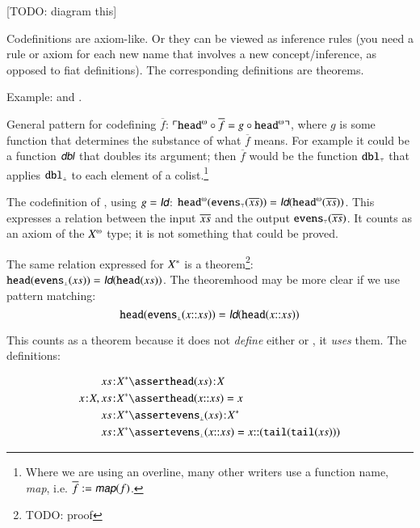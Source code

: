 [TODO: diagram this]


Codefinitions are axiom-like. Or they can be viewed as inference rules
(you need a rule or axiom for each new name that involves a new
concept/inference, as opposed to fiat definitions). The corresponding
definitions are theorems.

Example:  and .



\vspace{2ex}

General pattern for codefining \(\overline{f}\): \(\ulcorner
\cohead\circ\overline{f} = g\circ\cohead\urcorner\), where \(g\) is
some function that determines the substance of what \(\overline{f}\)
means. For example it could be a function \(\textsf{\slshape dbl}\)
that doubles its argument; then \(\overline{f}\) would be the function
\(\texttt{\upshape dbl}_{\scriptscriptstyle\top}\) that applies \(\texttt{\upshape dbl}_{\scriptscriptstyle\bot}\) to each element of a
colist.\footnote{Where we are using an overline, many other writers
use a function name, \textsf{\slshape map}, i.e. \(\overline{f} :=
\textsf{\slshape map}(f)\).}

\vspace{1ex}

The codefinition of , using \(g = \idfun\):
\(\cohead(\codefn{evens}(\coseq{x})) = \idfun(\cohead(\coseq{x}))\).
This expresses a relation between the input \(\overline{xs}\) and the
output \(\texttt{\upshape evens}_{\scriptscriptstyle\top}(\overline{xs})\). It counts as an axiom of the
\(\colist{X}\) type; it is not something that could be proved.

The same relation expressed for \({X^{*}}\) is a theorem\footnote{TODO: proof}:
\(\head(\defn{evens}(\seq{x})) = \idfun(\head(\seq{x}))\). The theoremhood may be more clear if we use pattern matching:
\[\head(\defn{evens}(x\cons\seq{x})) = \idfun(\head(x\cons\seq{x}))\]

This counts as a theorem because it does not \textit{define} either
\head{} or , it \textit{uses} them. The definitions:

\begin{align}
 \tj{\seq{x}}{\List{X}} & \linfer \tj{\head(\seq{x})}{X} \\
 \tj{x}{X},\tj{\seq{x}}{\List{X}} & \linfer \head(x\cons\seq{x}) = x \\
 \tj{\seq{x}}{\List{X}} & \linfer \tj{\defn{evens}(\seq{x})}{\List{X}} \\
 \tj{\seq{x}}{\List{X}} & \linfer \defn{evens}(x\cons\seq{x})
   = x\cons(\tail(\tail(\seq{x})))
\end{align}

